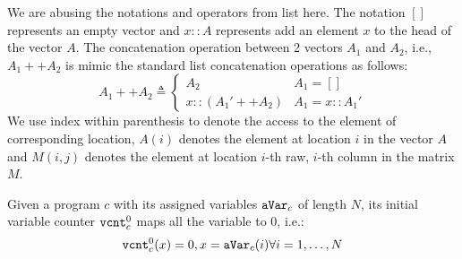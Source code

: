 %
We are abusing the notations and operators from list here. 
The notation $[]$ represents an empty vector
and $x::A$ represents add an element $x$ to the head of the vector $A$.
The concatenation operation between 2 vectors $A_1$ and $A_2$, i.e., $A_1 ++ A_2$ is mimic the standard list concatenation operations as follows:
%
\begin{equation}
    A_1 ++ A_2  
    \triangleq \left\{
    \begin{array}{ll} 
      A_2         & A_1 = []\\
      x::(A_1' ++ A_2)  & A_1 = x::A_1'
    \end{array}
    \right.
\end{equation}
%
We use index within parenthesis to denote the access to the element of corresponding location,
$A(i)$ denotes the element at location $i$ in the vector $A$ and 
$M(i, j)$ denotes the element at location $i$-th raw, $i$-th column in the matrix $M$. 
%
%
%
\begin{defn}
Given a program $c$ with its assigned variables $\mathtt{aVar}_{c}$ of length $N$, its initial variable counter $\mathtt{vcnt}^0_{c}$ maps all the variable to $0$, i.e.:
\[
  \mathtt{vcnt}^0_{c}(x) = 0, x = \mathtt{aVar}_{c}(i) \forall i = 1, \ldots, N 
\]
\end{defn}
%
%
